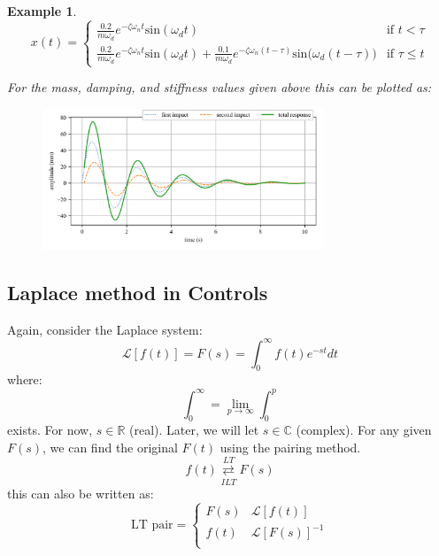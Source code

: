 \documentclass[12pt,letter]{article}
\newtheorem{ex}{Example}
\numberwithin{ex}{section} %
\newenvironment{example}{\begin{mdframed}[middlelinewidth=0.5mm]\begin{ex}\normalfont}{\end{ex}\end{mdframed}}
\numberwithin{re}{section} %
\newcommand{\Laplace}[1]{\ensuremath{\mathcal{L}{\left[#1\right]}}}
\numberwithin{equation}{section}	%
\begin{document}
\begin{example}
\[
  x(t) = 
  \begin{cases}
\frac{0.2}{m \omega_d} e^{-\zeta \omega_n t} \text{sin}(\omega_dt) & \text{if } t < \tau \\
\frac{0.2}{m \omega_d} e^{-\zeta \omega_n t} \text{sin}(\omega_dt)  + \frac{0.1}{m \omega_d} e^{-\zeta \omega_n (t-\tau)} \text{sin}\big(\omega_d(t-\tau)\big) & \text{if } \tau \leq t 
  \end{cases}
\]


For the mass, damping, and stiffness values given above this can be plotted as:
\begin{figure}[H]
	\centering
	\includegraphics[width=0.75\textwidth]{../figures/response_double_impact.png}
\end{figure}

\end{example}




		\subsection{Laplace method in Controls}

		Again, consider the Laplace system:
		\begin{equation}
				\Laplace{f(t)} = F(s) = \int_{0}^{\infty} f(t)e^{-st}dt
		\end{equation}
		where:
		\begin{equation}
			\int_{0}^{\infty} = \lim_{p \rightarrow \infty} \int_{0}^{p}
		\end{equation}
		exists. For now, $s \in \mathbb{R}$ (real). Later, we will let $s \in \mathbb{C} $ (complex). For any given $F(s)$, we can find the original $F(t)$ using the pairing method. 
		\begin{equation}
			f(t) \overset{LT}{\underset{ILT}\rightleftarrows} F(s) 
		\end{equation}
		this can also be written as:
		\begin{equation}
		\text{LT pair} =
			\begin{cases}
			F(s) & \Laplace{f(t)} \\
			f(t) & \Laplace{F(s)}^{-1} \\
			\end{cases}
		\end{equation}
\end{document}
